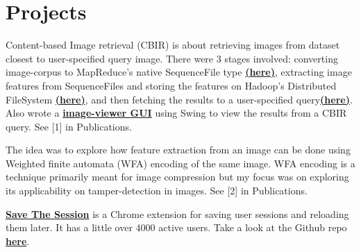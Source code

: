 \documentclass[]{deedy-resume-openfont}
\begin{document}
\begin{minipage}[t]{0.66\textwidth}

\section{Projects}
\descript{}
Content-based Image retrieval (CBIR) is about retrieving images from dataset closest to user-specified query image. There were 3 stages involved: converting image-corpus to MapReduce's native SequenceFile type \textbf{\href{https://github.com/sg1993/sequencify-CBIR-on-hadoop}{(here)}}, extracting image features from SequenceFiles and storing the features on Hadoop's Distributed FileSystem \textbf{\href{https://github.com/sg1993/CBIR-on-Hadoop}{(here)}}, and then fetching the results to a user-specified query\textbf{\href{https://github.com/sg1993/CBIR-query-on-Hadoop}{(here)}}. Also wrote a \textbf{\href{https://github.com/sg1993/CBIR-query-Image-Viewer}{image-viewer GUI}} using Swing to view the results from a CBIR query. See [1] in Publications.
\sectionsep

\descript{}
The idea was to explore how feature extraction from an image can be done using Weighted finite automata (WFA) encoding of the same image. WFA encoding is a technique primarily meant for image compression but my focus was on exploring its applicability on tamper-detection in images. See [2] in Publications.
\sectionsep

\descript{}
\textbf{\href{https://chrome.google.com/webstore/detail/save-the-session/gfokkgedgncpmhnbomipnbnpkedjpbil}{Save The Session}} is a Chrome extension for saving user sessions and reloading them later. It has a little over 4000 active users. Take a look at the Github repo  {\textbf{\href{https://github.com/sg1993/Save-The-Session}{here}}}.
\sectionsep




\end{minipage}
\end{document}
